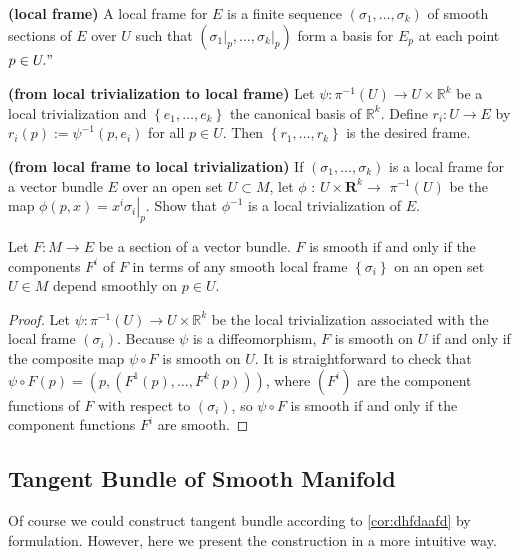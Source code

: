 \documentclass[12pt]{article} %
\newcommand{\bfs}[1]{\textbf{({#1}) }}
\begin{document}
\begin{defa}\bfs{local frame}
A local frame for $E$ is a finite sequence $\left(\sigma_{1}, \ldots, \sigma_{k}\right)$ of smooth sections of $E$ over $U$ such that $\left(\left.\sigma_{1}\right|_{p}, \ldots,\left.\sigma_{k}\right|_{p}\right)$ form a basis for $E_{p}$ at each point $p \in U . "$
\end{defa}
\begin{cora}\bfs{from local trivialization to local frame}
 Let $\psi: \pi^{-1}(U) \rightarrow U \times \mathbb{R}^{k}$ be a local trivialization and $\left\{e_{1}, \ldots, e_{k}\right\}$ the canonical basis of $\mathbb{R}^{k}$. Define $r_{i}: U \rightarrow E$ by $r_{i}(p):=\psi^{-1}\left(p, e_{i}\right)$ for all $p \in U$. Then $\left\{r_{1}, \ldots, r_{k}\right\}$ is the desired frame.
\end{cora}
\begin{cora}\bfs{from  local frame to local trivialization}
 If $\left(\sigma_{1}, \ldots, \sigma_{k}\right)$ is a local frame for a vector bundle $E$ over an open set $U \subset M$, let $\phi$ : $U \times \mathbf{R}^{k} \rightarrow$ $\pi^{-1}(U)$ be the map $\phi(p, x)=\left.x^{i} \sigma_{i}\right|_{p}$. Show that $\phi^{-1}$ is a local trivialization of $E$.
\end{cora}

\begin{lema}
Let $F: M \rightarrow E$ be a section of a vector bundle. $F$ is smooth if and only if the components $F^i$ of $F$ in terms of any smooth local frame $\left\{\sigma_{i}\right\}$ on an open set $U \in M$ depend smoothly on $p \in U$.
\end{lema}
\begin{proof}
 Let $\psi: \pi^{-1}(U) \rightarrow U \times \mathbb{R}^{k}$ be the local trivialization associated with the local frame $\left(\sigma_{i}\right)$. Because $\psi$ is a diffeomorphism, $F$ is smooth on $U$ if and only if the composite map $\psi \circ F$ is smooth on $U$. It is straightforward to check that $\psi \circ F(p)=\left(p,\left(F^{1}(p), \ldots, F^{k}(p)\right)\right)$, where $\left(F^{i}\right)$ are the component functions of $F$ with respect to $\left(\sigma_{i}\right)$, so $\psi \circ F$ is smooth if and only if the component functions $F^{i}$ are smooth.
\end{proof}
\subsection{Tangent Bundle of Smooth Manifold}
Of course we could construct tangent bundle according to \cref{cor:dhfdaafd} by formulation. However, here we present the construction in a more intuitive way.
\end{document}
